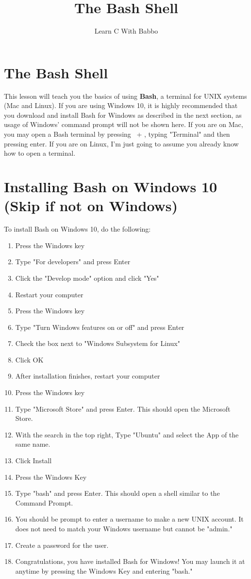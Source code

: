 \documentclass{article}
\begin{document}
\title{The Bash Shell}
\author{Learn C With Babbo}
\date{}

\section*{The Bash Shell}
This lesson will teach you the basics of using \textbf{Bash}, a terminal for UNIX systems (Mac and Linux). If you are
using Windows 10, it is highly recommended that you download and install Bash for Windows as described in the next
section, as usage of Windows' command
prompt will not be shown here. If you are on Mac, you may open a Bash terminal by pressing \cmdkey\ + \Spacebar, typing
"Terminal" and then pressing enter. If you are on Linux, I'm just going to assume you already know how to open a 
terminal.

\section*{Installing Bash on Windows 10 (Skip if not on Windows)}
To install Bash on Windows 10, do the following:
\begin{enumerate}
\item Press the Windows key
\item Type "For developers" and press Enter
\item Click the "Develop mode" option and click "Yes"
\item Restart your computer
\item Press the Windows key
\item Type "Turn Windows features on or off" and press Enter
\item Check the box next to "Windows Subsystem for Linux"
\item Click OK
\item After installation finishes, restart your computer
\item Press the Windows key
\item Type "Microsoft Store" and press Enter. This should open the Microsoft Store.
\item With the search in the top right, Type "Ubuntu" and select the App of the same name.
\item Click Install
\item Press the Windows Key
\item Type "bash" and press Enter. This should open a shell similar to the Command Prompt.
\item You should be prompt to enter a username to make a new UNIX account. It does not need to match your Windows
username but cannot be "admin."
\item Create a password for the user.
\item Congratulations, you have installed Bash for Windows! You may launch it at anytime by pressing the 
Windows Key and entering "bash."
\end{enumerate}
\end{document}
